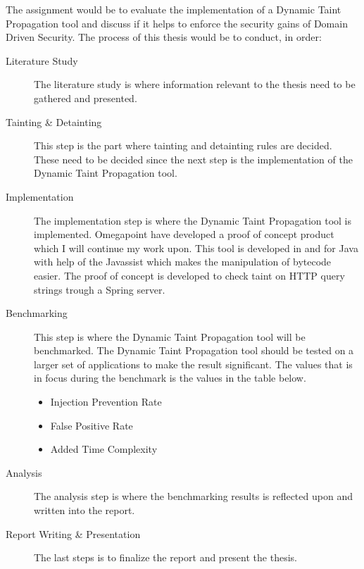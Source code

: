 \documentclass{../kththesis}
\begin{document}
\noindent
The assignment would be to evaluate the implementation of a Dynamic Taint Propagation tool and discuss if it helps to enforce the security gains of Domain Driven Security. The process of this thesis would be to conduct, in order:

\begin{description}  
	\item [Literature Study]
	The literature study is where information relevant to the thesis need to be gathered and presented.

	\item [Tainting \& Detainting]
	This step is the part where tainting and detainting rules are decided. These need to be decided since the next step is the implementation of the Dynamic Taint Propagation tool.

	\item [Implementation]
	The implementation step is where the Dynamic Taint Propagation tool is implemented. Omegapoint have developed a proof of concept product which I will continue my work upon. This tool is developed in and for Java with help of the Javassist \parencite{Javassist} which makes the manipulation of bytecode easier. The proof of concept is developed to check taint on HTTP query strings trough a Spring server.

	\item [Benchmarking]
	This step is where the Dynamic Taint Propagation tool will be benchmarked. The Dynamic Taint Propagation tool should be tested on a larger set of applications to make the result significant. The values that is in focus during the benchmark is the values in the table below. 
	
	\begin{itemize}  
		\item Injection Prevention Rate 
		\item False Positive Rate
		\item Added Time Complexity
	\end{itemize}

	\item [Analysis]
	The analysis step is where the benchmarking results is reflected upon and written into the report.

	\item [Report Writing \& Presentation]
	The last steps is to finalize the report and present the thesis.
\end{description}
\end{document}
